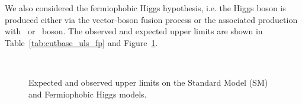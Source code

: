 We also considered the fermiophobic Higgs hypothesis, i.e. the Higgs
boson is produced either via the vector-boson fusion process or the
associated production with \W\ or \Z\ boson. The observed and expected
upper limits are shown in Table~\ref{tab:cutbase_uls_fp} and
Figure~\ref{fig:uls}.

\begin{figure}[!hbtp]
\centering
{}
\centering
{}
\centering
{}
 \\ 
\caption{Expected and observed upper limits on the Standard Model (SM)
  and Fermiophobic Higgs models.}
\label{fig:uls}
\end{figure}


